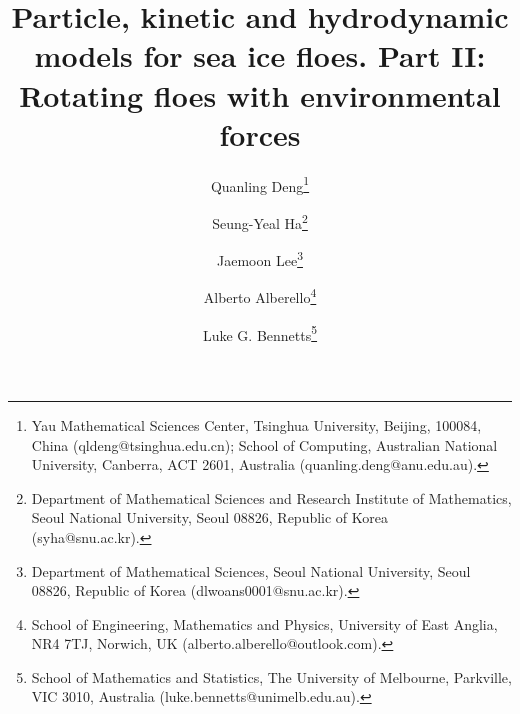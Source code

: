\documentclass[a4paper,11pt]{article}
\date{\vspace{-6ex}}
\numberwithin{equation}{section}
\theoremstyle{definition}
\begin{document}


\newcommand{\Question}[1]{{\marginpar{\color{blue}\footnotesize #1}}}
\newcommand{\blue}[1]{{\color{blue}#1}}
\newcommand{\red}[1]{{\color{red} #1}}

\newif \ifNUM \NUMtrue

\title{Particle, kinetic and hydrodynamic models for sea ice floes. Part II: Rotating floes with environmental forces} %
%

\author{Quanling Deng\thanks{Yau Mathematical Sciences Center, Tsinghua University, Beijing, 100084, China (qldeng@tsinghua.edu.cn); School of Computing, Australian National University, Canberra, ACT 2601, Australia (quanling.deng@anu.edu.au).}
\and Seung-Yeal Ha\thanks{Department of Mathematical Sciences and Research Institute of Mathematics, Seoul National University, Seoul 08826, Republic of Korea (syha@snu.ac.kr).}
\and Jaemoon Lee\thanks{Department of Mathematical Sciences, Seoul National University, Seoul 08826, Republic of Korea (dlwoans0001@snu.ac.kr).}
\and Alberto Alberello\thanks{School of Engineering, Mathematics and Physics, University of East Anglia, NR4 7TJ, Norwich, UK (alberto.alberello@outlook.com).} 
\and Luke G. Bennetts\thanks{School of Mathematics and Statistics, The University of Melbourne, Parkville, VIC 3010, Australia (luke.bennetts@unimelb.edu.au).}
}


\maketitle
\end{document}
